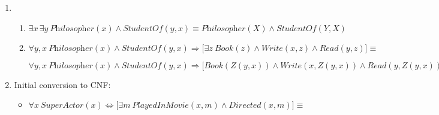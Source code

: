\begin{enumerate}
\begin{enumerate}
\begin{enumerate}
\item \textsc{Unify}$\big(\textit{Kant}, \textit{Author}(y), []\big)$

$\big[\theta \neq \textit{failure}\big] \land \big[x \neq y\big] \land \big[\textit{Variable?}(x) = \textit{False}\big] \land \big[\textsc{Variable?}(y) = \textit{False}\big] \land\\
\big[ \textsc{Compound?}(x) = \textit{False} \land \textsc{Compound?}(y) = \textit{True} \big] \land\\
\big[ \textsc{List?}(x) = \textit{False} \land \textsc{List?}(y) = \textit{False} \big]$

Returns: \textit{failure}
\end{enumerate}

The \textsc{Unify} algorithm fails to find a \textit{unifier} for the pair of atomic sentences.\\However, the unifier $\{y / \textit{Critique}\,\}$ makes the following statement true:

$\big[ \textsc{Subst}(\{y / \textit{Critique} \,\}, \textit{Write}(\textit{Kant}, \textit{Critique})) =
\textsc{Subst}(\{y / \textit{Critique} \,\}, \textit{Write}(\textit{Author}(y), y)) \big]$

$\Leftrightarrow$

$\big[ \textit{Write}(\textit{Kant}, \textit{Critique}) =
\textit{Write}(\textit{Author}(\textit{Critique}), \textit{Critique}) \big]$
\end{enumerate}

\item
\begin{enumerate}
\item
$\exists x \, \exists y ~ \textit{Philosopher}(x) \land \textit{StudentOf}(y, x) \equiv \textit{Philosopher}(X) \land \textit{StudentOf}(Y, X)$

\item
$\forall y, x ~ \textit{Philosopher}(x) \land \textit{StudentOf}(y, x) \Rightarrow \big[ \exists z ~ \textit{Book}(z) \land \textit{Write}(x, z) \land \textit{Read}(y, z) \big] \equiv$

$\forall y, x ~ \textit{Philosopher}(x) \land \textit{StudentOf}(y, x) \Rightarrow \big[ \textit{Book}(Z(y, x)) \land \textit{Write}(x, Z(y, x)) \land \textit{Read}(y, Z(y, x)) \big]$
\end{enumerate}

\item
Initial conversion to \ac{CNF}:
\begin{itemize}
\item
$\forall x ~ \textit{SuperActor}(x) \Leftrightarrow \big[ \exists m ~ \textit{PlayedInMovie}(x, m) \land \textit{Directed}(x, m) \big] \equiv$


\end{itemize}
\end{enumerate}
